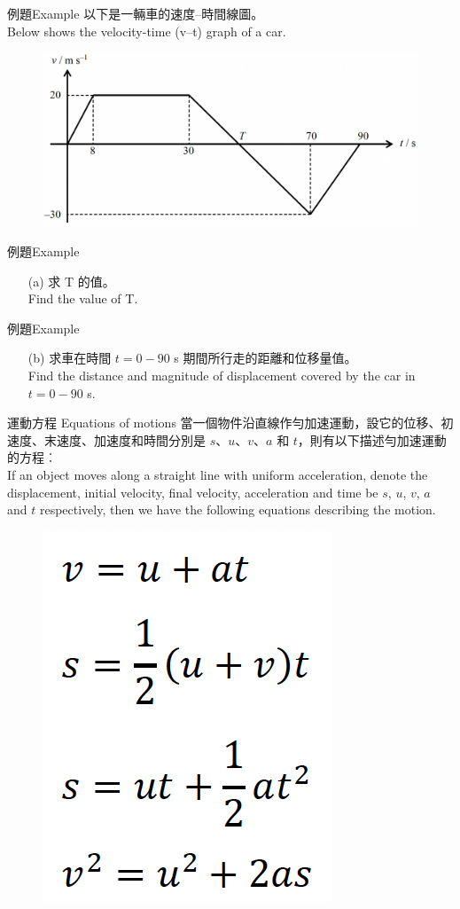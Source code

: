 \documentclass[beamer=true]{standalone}
\begin{document}
\begin{frame}{例題Example}
    以下是一輛車的速度–時間線圖。 \\Below shows the velocity-time (v–t) graph of a car.
    \begin{figure}[h!]
        \centering
        \includegraphics[width=\textwidth]{../../assets/c30be131.png}
    \end{figure}
\end{frame}
\begin{frame}[t]{例題Example}
    \begin{itemize}
        \item [(a)] 求 T 的值。 \\Find the value of T.
    \end{itemize}
\end{frame}
\begin{frame}[t]{例題Example}
    \begin{itemize}
        \item [(b)] 求車在時間 $t = 0-90$ s 期間所行走的距離和位移量值。 \\Find the distance and magnitude of displacement covered by the car in $t = 0-90$ s.
    \end{itemize}
\end{frame}

\begin{frame}{運動方程 Equations of motions}
    當一個物件沿直線作勻加速運動，設它的位移、初速度、末速度、加速度和時間分別是 $\mathit{s}$、$\mathit{u}$、$\mathit{v}$、$\mathit{a}$ 和 $\mathit{t}$，則有以下描述勻加速運動的方程︰ \\If an object moves along a straight line with uniform acceleration, denote the displacement, initial velocity, final velocity, acceleration and time be $\mathit{s}$, $\mathit{u}$, $\mathit{v}$, $\mathit{a}$ and $\mathit{t}$ respectively, then we have the following equations describing the motion.
    \begin{figure}[h!]
        \centering
        \includegraphics[width=.2\textwidth]{../../assets/6d3f21f0.png}
    \end{figure}
\end{frame}
\end{document}
